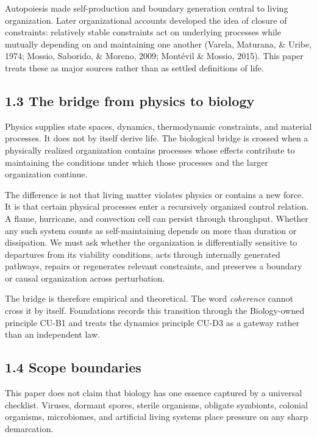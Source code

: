 \documentclass[
  11pt,
]{article}
\begin{document}
Autopoiesis made self-production and boundary generation central to
living organization. Later organizational accounts developed the idea of
closure of constraints: relatively stable constraints act on underlying
processes while mutually depending on and maintaining one another
(Varela, Maturana, \& Uribe, 1974; Mossio, Saborido, \& Moreno, 2009;
Montévil \& Mossio, 2015). This paper treats these as major sources
rather than as settled definitions of life.

\subsection{1.3 The bridge from physics to
biology}\label{the-bridge-from-physics-to-biology}

Physics supplies state spaces, dynamics, thermodynamic constraints, and
material processes. It does not by itself derive life. The biological
bridge is crossed when a physically realized organization contains
processes whose effects contribute to maintaining the conditions under
which those processes and the larger organization continue.

The difference is not that living matter violates physics or contains a
new force. It is that certain physical processes enter a recursively
organized control relation. A flame, hurricane, and convection cell can
persist through throughput. Whether any such system counts as
self-maintaining depends on more than duration or dissipation. We must
ask whether the organization is differentially sensitive to departures
from its viability conditions, acts through internally generated
pathways, repairs or regenerates relevant constraints, and preserves a
boundary or causal organization across perturbation.

The bridge is therefore empirical and theoretical. The word
\emph{coherence} cannot cross it by itself. Foundations records this
transition through the Biology-owned principle CU-B1 and treats the
dynamics principle CU-D3 as a gateway rather than an independent law.

\subsection{1.4 Scope boundaries}\label{scope-boundaries}

This paper does not claim that biology has one essence captured by a
universal checklist. Viruses, dormant spores, sterile organisms,
obligate symbionts, colonial organisms, microbiomes, and artificial
living systems place pressure on any sharp demarcation.
\end{document}
